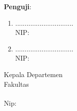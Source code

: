 {\begin{center}
	\textbf{Penguji}:
\end{center}
\begin{enumerate}
	\item \PjSatu \hfill ...............................\\
	NIP:\NipPjSatu\vfill
	\item \PjDua \hfill ...............................\\
	NIP:\NipPjDua\vfill {}
\end{enumerate}	
\vfill
\begin{center}
	Kepala Departemen \Dep \\
	Fakultas \fak\\
	\vspace{9ex}
	\underline{\NmKaDep}\\
	Nip:\NipKaDep
\end{center}
\newpage
}
